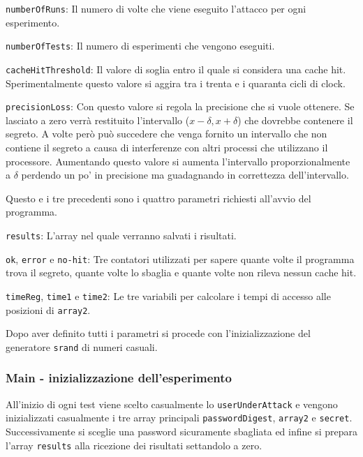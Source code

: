 					\texttt{numberOfRuns}: Il numero di volte che viene eseguito l'attacco per ogni esperimento.
					
					\texttt{numberOfTests}: Il numero di esperimenti che vengono eseguiti.
					
					\texttt{cacheHitThreshold}: Il valore di soglia entro il quale si considera una cache hit. Sperimentalmente questo valore si aggira tra i trenta e i quaranta cicli di clock.
					
					\texttt{precisionLoss}: Con questo valore si regola la precisione che si vuole ottenere. Se lasciato a zero verrà restituito l'intervallo ($x-\delta, x+\delta$) che dovrebbe contenere il segreto. A volte però può succedere che venga fornito un intervallo che non contiene il segreto a causa di interferenze con altri processi che utilizzano il processore. Aumentando questo valore si aumenta l'intervallo proporzionalmente a $\delta$ perdendo un po' in precisione ma guadagnando in correttezza dell'intervallo.
					
					Questo e i tre precedenti sono i quattro parametri richiesti all'avvio del programma.
					
					\texttt{results}: L'array nel quale verranno salvati i risultati.
					
					\texttt{ok}, \texttt{error} e \texttt{no-hit}: Tre contatori utilizzati per sapere quante volte il programma trova il segreto, quante volte lo sbaglia e quante volte non rileva nessun cache hit.
					
					\texttt{timeReg}, \texttt{time1} e \texttt{time2}: Le tre variabili per calcolare i tempi di accesso alle posizioni di \texttt{array2}.
			
				Dopo aver definito tutti i parametri si procede con l'inizializzazione del generatore \texttt{srand} di numeri casuali.
				
				\subsubsection{Main - inizializzazione dell'esperimento}
				
				All'inizio di ogni test viene scelto casualmente lo \texttt{userUnderAttack} e vengono inizializzati casualmente i tre array principali \texttt{passwordDigest}, \texttt{array2} e \texttt{secret}. Successivamente si sceglie una password sicuramente sbagliata ed infine si prepara l'array \texttt{results} alla ricezione dei risultati settandolo a zero.
				
